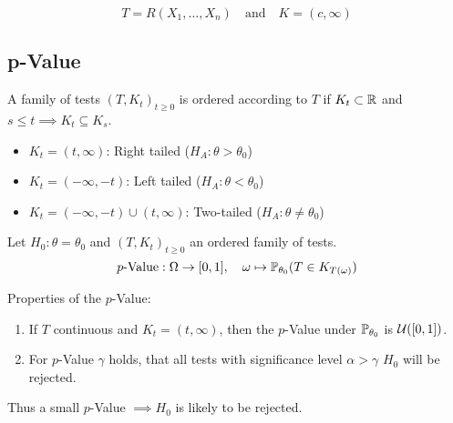 \begin{definition*} \vspace{-7pt}
  \[T = R(X_1, \ldots, X_n) \quad \text{and} \quad K = (c, \infty)\]
\end{definition*}

\subsection{p-Value}
\begin{definition*}
  A family of tests \((T, K_t)_{t \geq 0}\) is ordered according to \(T\) if \(K_t \subset \R\) and \(s \leq t \implies K_t \subseteq K_s\).
  \begin{itemize}
    \item \(K_t = (t, \infty)\): Right tailed (\(H_A: \theta > \theta_0\))
    \item \(K_t = (-\infty, -t)\): Left tailed (\(H_A: \theta < \theta_0\))
    \item \(K_t = (-\infty, -t) \cup (t, \infty)\): Two-tailed (\(H_A: \theta \neq \theta_0\))
  \end{itemize}
\end{definition*}

\begin{definition*}[\(p\)-Value]
  Let \(H_0: \theta = \theta_0\) and \((T, K_t)_{t \geq 0}\) an ordered family of tests.
  \[\text{\(p\)-Value}: \Omega \to [0, 1], \quad \omega \mapsto \P_{\theta_0}(T \in K_{T(\omega)})\]
\end{definition*}

Properties of the \(p\)-Value:
\begin{enumerate}
  \item If \(T\) continuous and \(K_t = (t, \infty)\), then the \(p\)-Value under \(\P_{\theta_0}\) is \(\Unif([0, 1])\).
  \item For \(p\)-Value \(\gamma\) holds, that all tests with significance level \(\alpha > \gamma\) \(H_0\) will be rejected.
\end{enumerate}

Thus a small \(p\)-Value \(\implies H_0\) is likely to be rejected.
